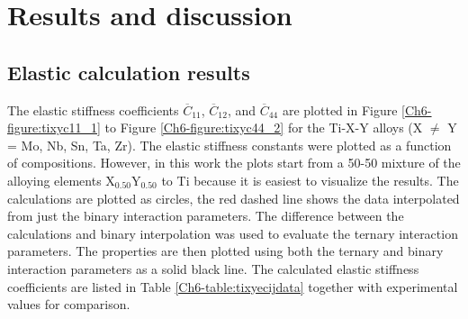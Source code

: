 \section{Results and discussion}

\subsection{Elastic calculation results}

The elastic stiffness coefficients $\overline{C}_{11}$, $\overline{C}_{12}$, and $\overline{C}_{44}$ are plotted in Figure \ref{Ch6-figure:tixyc11_1} to Figure \ref{Ch6-figure:tixyc44_2} for the Ti-X-Y alloys (X $\neq$ Y = Mo, Nb, Sn, Ta, Zr). The elastic stiffness constants were plotted as a function of compositions. However, in this work the plots start from a 50-50 mixture of the alloying elements X$_{0.50}$Y$_{0.50}$ to Ti because it is easiest to visualize the results. The calculations are plotted as circles, the red dashed line shows the data interpolated from just the binary interaction parameters. The difference between the calculations and binary interpolation was used to evaluate the ternary interaction parameters. The properties are then plotted using both the ternary and binary interaction parameters as a solid black line. The calculated elastic stiffness coefficients are listed in Table \ref{Ch6-table:tixyecijdata} together with experimental values \cite{Niinomi2012,Mohammed2014,Nozoe2007,Geetha2009} for comparison.

